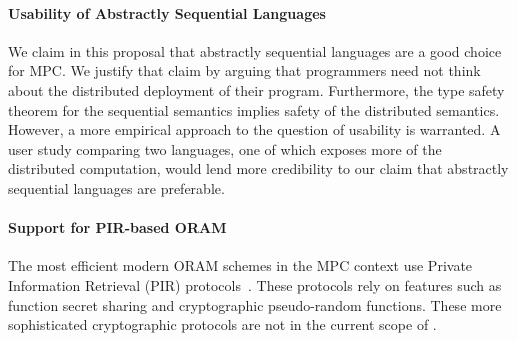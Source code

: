 \paragraph{Usability of Abstractly Sequential Languages}
We claim in this proposal that abstractly sequential languages are a good choice for MPC. We justify that claim by arguing that
programmers need not think about the distributed deployment of their program. Furthermore, the type safety theorem for the sequential
semantics implies safety of the distributed semantics. However, a more empirical approach to the question of usability is warranted.
A user study comparing two languages, one of which exposes more of the distributed computation, would lend more credibility to our claim
that abstractly sequential languages are preferable.

\paragraph{Support for PIR-based ORAM}
The most efficient modern ORAM schemes in the MPC context use Private Information Retrieval (PIR) protocols~\cite{10.1145/3133956.3133967}. These protocols rely on
features such as function secret sharing and cryptographic pseudo-random functions. These more sophisticated cryptographic protocols
are not in the current scope of \lang.
